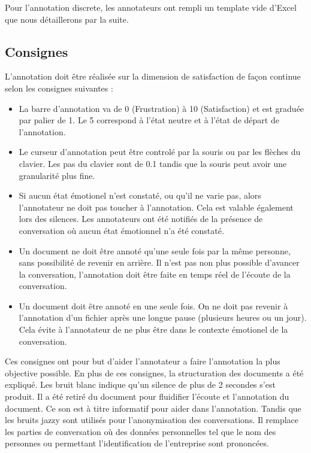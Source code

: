 Pour l'annotation discrete, les annotateurs ont rempli un template vide d'Excel que nous détaillerons par la suite.

\subsection{Consignes}

L'annotation doit être réalisée sur la dimension de satisfaction de façon continue selon les consignes suivantes :
\begin{itemize}
  \item La barre d'annotation va de 0 (Frustration) à 10 (Satisfaction) et est graduée par palier de 1. Le 5 correspond à l'état neutre et à l'état de départ de l'annotation.
  \item Le curseur d'annotation peut être controlé par la souris ou par les flèches du clavier. Les pas du clavier sont de 0.1 tandis que la souris peut avoir une granularité plus fine.
  \item Si aucun état émotionel n'est constaté, ou qu'il ne varie pas, alors l'annotateur ne doit pas toucher à l'annotation. Cela est valable également lors des silences. Les annotateurs ont été notifiés de la présence de conversation où aucun état émotionnel n'a été constaté.
  \item Un document ne doit être annoté qu'une seule fois par la même personne, sans possibilité de revenir en arrière. Il n'est pas non plus possible d'avancer la conversation, l'annotation doit être faite en temps réel de l'écoute de la conversation.
  \item Un document doit être annoté en une seule fois. On ne doit pas revenir à l'annotation d'un fichier après une longue pause (plusieurs heures ou un jour). Cela évite à l'annotateur de ne plus être dans le contexte émotionel de la conversation.
\end{itemize}

Ces consignes ont pour but d'aider l'annotateur a faire l'annotation la plus objective possible. En plus de ces consignes, la structuration des documents a été expliqué. Les bruit blanc indique qu'un silence de plus de 2 secondes s'est produit. Il a été retiré du document pour fluidifier l'écoute et l'annotation du document. Ce son est à titre informatif pour aider dans l'annotation. Tandis que  les bruits jazzy sont utilisés pour l'anonymisation des conversations. Il remplace les parties de conversation où des données personnelles tel que le nom des personnes ou permettant l'identification de l'entreprise sont prononcées.

